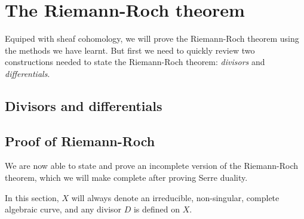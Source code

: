 \documentclass[12pt]{article}
\begin{document}
\section{The Riemann-Roch theorem}
Equiped with sheaf cohomology, we will prove the Riemann-Roch theorem
using the methods we have learnt. But first we need to quickly review
two constructions needed to state the Riemann-Roch theorem: \emph{divisors}
and \emph{differentials}.

\subsection{Divisors and differentials}

\subsection{Proof of Riemann-Roch}
We are now able to state and prove an incomplete version of the Riemann-Roch
theorem, which we will make complete after proving Serre duality.

\begin{lnote}
  In this section, $X$ will always denote an irreducible, non-singular,
  complete algebraic curve, and any divisor $D$ is defined on $X$.
\end{lnote}

\end{document}
